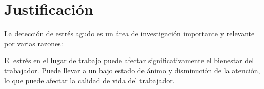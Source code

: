 



\section{Justificación}


La detección de estrés agudo es un área de investigación importante y relevante por varias razones:

El estrés en el lugar de trabajo puede afectar significativamente el bienestar del trabajador. Puede llevar a un bajo estado de ánimo y disminución de la atención, lo que puede afectar la calidad de vida del trabajador.

